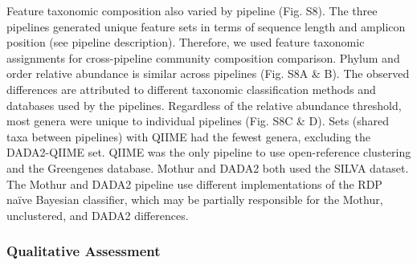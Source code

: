 \documentclass[linenumbers]{bmcart}
\begin{document}
Feature taxonomic composition also varied by pipeline (Fig. S8). 
The three pipelines generated unique feature sets in terms of sequence
length and amplicon position (see pipeline description). Therefore, we
used feature taxonomic assignments for cross-pipeline community composition comparison.
Phylum and order relative abundance is similar
across pipelines (Fig. S8A \& B). The observed
differences are attributed to different taxonomic classification methods
and databases used by the pipelines. Regardless
of the relative abundance threshold, most genera were
unique to individual pipelines (Fig. S8C \& D). Sets (shared taxa between pipelines) with QIIME had the fewest genera,
excluding the DADA2-QIIME set. QIIME was the only pipeline to use
open-reference clustering and the Greengenes database. Mothur and DADA2
both used the SILVA dataset. The Mothur and DADA2 pipeline use different
implementations of the RDP naïve Bayesian classifier, which may be
partially responsible for the Mothur, unclustered, and DADA2
differences.

\subsubsection*{Qualitative Assessment}
\end{document}
